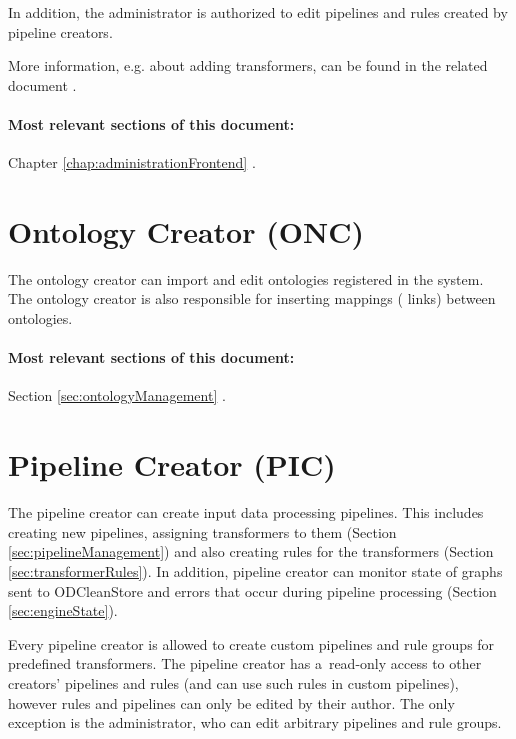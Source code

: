 	In addition, the administrator is authorized to edit pipelines and rules created by pipeline creators.



	More information, e.g. about adding transformers, can be found in the related document .

	\paragraph{Most relevant sections of this document:} Chapter \ref{chap:administrationFrontend} .

\section[Ontology Creator]{Ontology Creator (ONC)}
\label{sec:onc}
	The ontology creator can import and edit ontologies registered in the system. The ontology creator is also responsible for inserting mappings ( links) between ontologies.

	\paragraph{Most relevant sections of this document:} Section \ref{sec:ontologyManagement} .

\section[Pipeline Creator]{Pipeline Creator (PIC)}
\label{sec:pic}
	The pipeline creator can create input data processing pipelines. This includes creating new pipelines, assigning transformers to them (Section \ref{sec:pipelineManagement}) and also creating rules for the transformers (Section \ref{sec:transformerRules}). In addition, pipeline creator can monitor state of graphs sent to ODCleanStore and errors that occur during pipeline processing (Section \ref{sec:engineState}).

	Every pipeline creator is allowed to create custom pipelines and rule groups for predefined transformers. The pipeline creator has a~read-only access to other creators' pipelines and rules (and can use such rules in custom pipelines), however rules and pipelines can only be edited by their author. The only exception is the administrator, who can edit arbitrary pipelines and rule groups.

